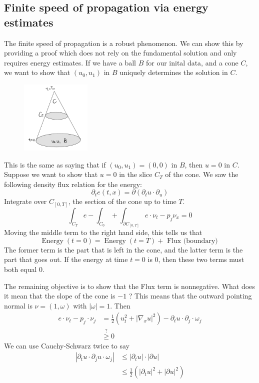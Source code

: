\subsection{Finite speed of propagation via energy estimates}
The finite speed of propagation is a robust phenomenon. We can show this by providing a proof which does not rely on the fundamental solution and only requires energy estimates. If we have a ball $B$ for our inital data, and a cone $C$, we want to show that $\left(u_{0}, u_{1}\right)$ in $B$ uniquely determines the solution in $C$.

\begin{figure}[H]
    \centering
    \includegraphics[width=0.3\textwidth]{Pics/25-7.png}
\end{figure}
This is the same as saying that if $\left(u_{0}, u_{1}\right)=(0,0)$ in $B$, then $u=0$ in $C .$ Suppose we want to show that $u=0$ in the slice $C_{T}$ of the cone. We saw the following density flux relation for the energy:
$$
\partial_{t} e(t, x)=\partial\left(\partial_{t} u \cdot \partial_{u}\right)
$$
Integrate over $C_{[0, T]}$, the section of the cone up to time $T$.
$$
\int_{C_{T}} e-\int_{C_{0}} +\int_{\partial C_{[0, T]}} e \cdot \nu_{t}-p_{j} \nu_{x}=0
$$
Moving the middle term to the right hand side, this tells us that
$$
\operatorname{Energy}(t=0)=\operatorname{Energy}(t=T)+\text { Flux (boundary) }
$$
The former term is the part that is left in the cone, and the latter term is the part that goes out. If the energy at time $t=0$ is 0, then these two terms must both equal $0 .$

The remaining objective is to show that the Flux term is nonnegative. What does it mean that the slope of the cone is $-1$ ? This means that the outward pointing normal is $\nu=(1, \omega)$ with $|\omega|=1$. Then
$$
\begin{aligned}
e \cdot \nu_{t}-p_{j} \cdot \nu_{j} &=\frac{1}{2}\left(u_{t}^{2}+\left|\nabla_{x} u\right|^{2}\right)-\partial_{t} u \cdot \partial_{j} \cdot \omega_{j} \\
& \stackrel{?}{\geq} 0
\end{aligned}
$$
We can use Cauchy-Schwarz twice to say
$$
\begin{aligned}
\left|\partial_{t} u \cdot \partial_{j} u \cdot \omega_{j}\right| & \leq\left|\partial_{t} u\right| \cdot|\partial u| \\
& \leq \frac{1}{2}\left(\left|\partial_{t} u\right|^{2}+|\partial u|^{2}\right)
\end{aligned}
$$
